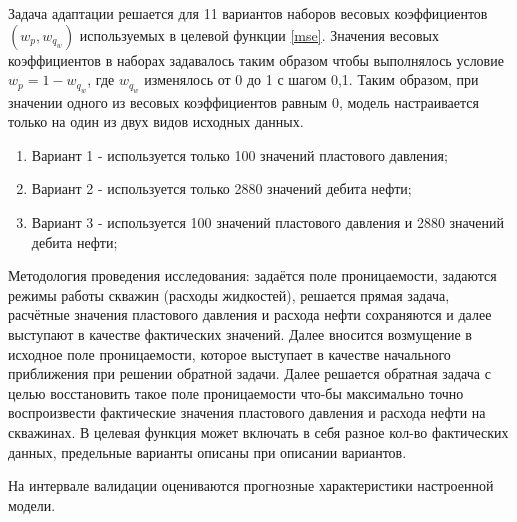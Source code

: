 \documentclass{article}
\begin{document}
Задача адаптации решается для 11 вариантов наборов весовых коэффициентов $(w_p, w_{q_w})$ используемых в целевой функции {\ref{mse}}. Значения весовых коэффициентов в наборах задавалось таким образом чтобы выполнялось условие $w_p = 1 - w_{q_w}$, где $w_{q_w}$ изменялось от 0 до 1 с шагом 0,1. Таким образом, при значении одного из весовых коэффициентов равным 0, модель настраивается только на один из двух видов исходных данных. 
\begin{enumerate}
	\item Вариант 1 - используется только 100 значений пластового давления;
	\item Вариант 2 - используется только 2880 значений дебита нефти;
	\item Вариант 3 - используется 100 значений пластового давления и 2880 значений дебита нефти;
\end{enumerate}
Методология проведения исследования: задаётся поле проницаемости, задаются режимы работы скважин (расходы жидкостей), решается прямая задача, расчётные значения пластового давления и расхода нефти сохраняются и далее выступают в качестве фактических значений. Далее вносится возмущение в исходное поле проницаемости, которое выступает в качестве начального приближения при решении обратной задачи. Далее решается обратная задача с целью восстановить такое поле проницаемости что-бы максимально точно воспроизвести фактические значения пластового давления и расхода нефти на скважинах. В целевая функция может включать в себя разное кол-во фактических данных, предельные варианты описаны при описании вариантов.

На интервале валидации оцениваются прогнозные характеристики настроенной модели. 
\end{document}
